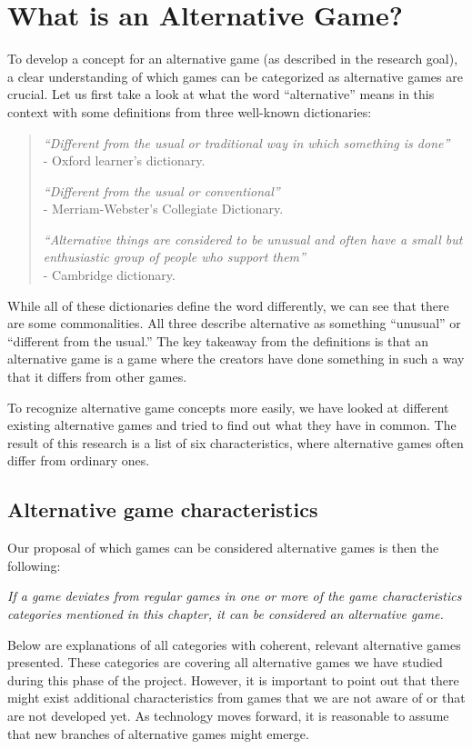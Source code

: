 \documentclass[../Main.tex]{subfiles}
\begin{document}
\section{What is an Alternative Game?}
\label{chap:5}
To develop a concept for an alternative game (as described in the research goal), a clear understanding of which games can be categorized as alternative games are crucial. Let us first take a look at what the word “alternative” means in this context with some definitions from three well-known dictionaries:

\blockquote{
    \textit{“Different from the usual or traditional way in which something is done”} \\
    - Oxford learner's dictionary.
    
    \textit{“Different from the usual or conventional”} \\
    - Merriam-Webster's Collegiate Dictionary.
     
    \textit{“Alternative things are considered to be unusual and often have a small but enthusiastic group of people who support them”} \\
    - Cambridge dictionary.
}

While all of these dictionaries define the word differently, we can see that there are some commonalities. All three describe alternative as something “unusual” or “different from the usual.” The key takeaway from the definitions is that an alternative game is a game where the creators have done something in such a way that it differs from other games.

To recognize alternative game concepts more easily, we have looked at different existing alternative games and tried to find out what they have in common. The result of this research is a list of six characteristics, where alternative games often differ from ordinary ones.

\subsection{Alternative game characteristics}
Our proposal of which games can be considered alternative games is then the following:

\textit{If a game deviates from regular games in one or more of the game characteristics categories mentioned in this chapter, it can be considered an alternative game.}

Below are explanations of all categories with coherent, relevant alternative games presented. These categories are covering all alternative games we have studied during this phase of the project. However, it is important to point out that there might exist additional characteristics from games that we are not aware of or that are not developed yet. As technology moves forward, it is reasonable to assume that new branches of alternative games might emerge.
\end{document}
